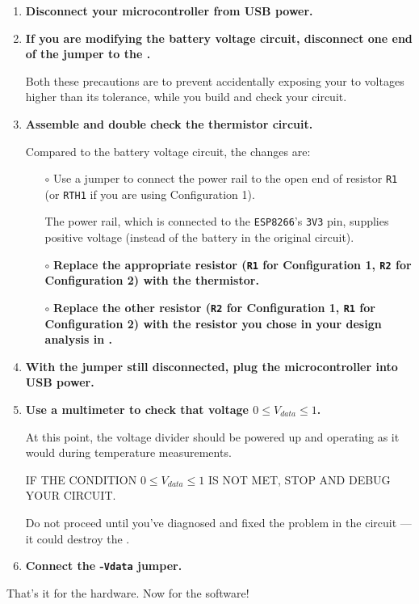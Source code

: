 \begin{enumerate}
	\item \textbf{Disconnect your microcontroller from USB power.}
	
	\item \textbf{If you are modifying the battery voltage circuit, disconnect one end of the jumper to the \adc.}
	
	Both these precautions are to prevent accidentally exposing your \adc to voltages higher than its tolerance, while you build and check your circuit. 

	\item \textbf{Assemble and double check the thermistor circuit.}

Compared to the battery voltage circuit, the changes are:
	\begin{itemize}
		\item[$\circ$] Use a jumper to connect the power rail to the open end of resistor \texttt{R1} (or \texttt{RTH1} if you are using Configuration 1).
		
		The power rail, which is connected to the \texttt{ESP8266}'s \texttt{3V3} pin, supplies positive voltage (instead of the battery in the original circuit). 
		\item[$\circ$] \textbf{Replace the appropriate resistor (\texttt{R1} for Configuration 1, \texttt{R2} for Configuration 2) with the thermistor.} 
		\item[$\circ$] \textbf{Replace the other resistor (\texttt{R2} for Configuration 1, \texttt{R1} for Configuration 2) with the resistor you chose in your design analysis in .}
	\end{itemize}	

	\item \textbf{With the \adc jumper still disconnected, plug the microcontroller into USB power.}
		
	\item \textbf{Use a multimeter to check that voltage $0 \le V_{data} \le 1$.}
	
	At this point, the voltage divider should be powered up and operating as it would during temperature measurements.
	
	\smallskip
	IF THE CONDITION $0 \le V_{data} \le 1$ IS NOT MET, STOP AND DEBUG YOUR CIRCUIT.
	
	\smallskip
	Do not proceed until you've diagnosed and fixed the problem in the circuit --- it could destroy the \adc.

	\item \textbf{Connect the \adc-\texttt{Vdata} jumper.}
		
\end{enumerate}
That's it for the hardware.
Now for the software!

